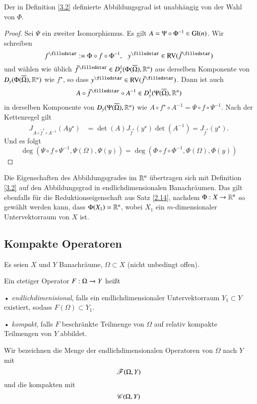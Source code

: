 \begin{prop}\label{3.3}
    Der in Definition \ref{3.2} definierte Abbildungsgrad ist unabhängig von der Wahl von $\Phi$.
\end{prop}

\begin{proof}
    Sei $\Psi$ ein zweiter Isomorphismus. Es gilt $A=\Psi\circ\Phi^{-1}\in \mathrm{Gl}(n)$. Wir schreiben
    \[
        f^\star:=\Phi \circ f \circ \Phi^{-1}, \qq y^\star\in \RV(\tilde f^\star)
    \]
    und wählen wie üblich $\tilde f^\star\in D^1_y(\Phi(\ol\Omega),\R^n)$ aus derselben Komponente von
    $D_y(\Phi(\overline \Omega),\mathbb{R}^n)$ wie $f^\star$, so dass $y^\star\in \RV(\tilde f^\star)$. Dann ist auch
    \[
        A\circ \tilde f^\star \circ A^{-1}\in D^1_y(\Psi (\ol \Omega),\R^n)
    \]
    in derselben Komponente von $D_y(\Psi(\overline \Omega),\mathbb{R}^n)$ wie $A\circ f^\star\circ A^{-1}=\Psi\circ
    f\circ \Psi^{-1}$.
    Nach der Kettenregel gilt
    \begin{align*}
        J_{A\circ \tilde f^\star\circ A^{-1}}(Ay^\star)&= \det(A) J_{\tilde f^\star}(y^\star)
        \det(A^{-1})=J_{\tilde f^\star} (y^\star).
    \end{align*}
    Und es folgt
    \[ 
        \deg(\Psi\circ f \circ\Psi^{-1},\Psi(\Omega),\Psi(y))
        = \deg(\Phi\circ f \circ\Phi^{-1},\Phi(\Omega),\Phi(y))
    \]
\end{proof}

Die Eigenschaften des Abbildungsgrades im $\mathbb{R}^n$ übertragen sich mit Definition \ref{3.2} auf den
Abbildungsgrad in endlichdimensionalen Banachräumen. Das gilt ebenfalls für die Reduktionseigenschaft aus
Satz \ref{2.14}, nachdem $\Phi:X\rightarrow\mathbb{R}^n$ so gewählt werden kann, dass $\Phi(X_1)=\mathbb{R}^n$, wobei $X_1$ ein
$m$-dimensionaler Untervektorraum von $X$ ist.

\subsection{Kompakte Operatoren}

Es seien $X$ und $Y$ Banachräume, $\Omega\subset X$ (nicht unbedingt offen).

\begin{defi}
    Ein stetiger Operator $F:\Omega\rightarrow Y$ heißt
    \begin{description}
        \item{•} \textit{endlichdimenisional}, falls ein endlichdimensionaler Untervektorraum $Y_1\subset Y$
        existiert, sodass $F(\Omega)\subset Y_1$.
        \item{•} \textit{kompakt}, falls $F$ beschränkte Teilmenge von $\Omega$ auf relativ kompakte
        Teilmengen von $Y$ abbildet.
    \end{description}
    Wir bezeichnen die Menge der endlichdimensionalen Operatoren von $\Omega$ nach $Y$ mit
    \[
        \mathscr F(\Omega,Y)
    \]
    und die kompakten mit
    \[
        \mathscr C(\Omega,Y)
    \]
\end{defi}

